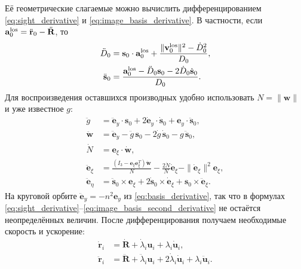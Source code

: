 \documentclass[a4paper,12pt]{article}
\begin{document}
Её геометрические слагаемые можно вычислить
дифференцированием \eqref{eq:sight_derivative} и
\eqref{eq:image_basis_derivative}. В частности, если
$\mathbf a_0^{\rm los}=\ddot{\mathbf r}_0-\ddot{\mathbf R}$,
то
\begin{equation}
\begin{aligned}
 \ddot D_0&=\mathbf s_0\cdot\mathbf a_0^{\rm los}
       +\frac{\|\mathbf v_0^{\rm los}\|^2-\dot D_0^2}{D_0},\\
 \ddot{\mathbf s}_0
   &=\frac{\mathbf a_0^{\rm los}
           -\ddot D_0\mathbf s_0
           -2\dot D_0\dot{\mathbf s}_0}{D_0}.
\end{aligned}
\label{eq:sight_second_derivative}
\end{equation}
Для воспроизведения оставшихся производных удобно использовать
$N=\|\mathbf w\|$ и уже известное $g$:
\begin{equation}
\begin{aligned}
 \ddot g&=\ddot{\mathbf e}_y\cdot\mathbf s_0
   +2\dot{\mathbf e}_y\cdot\dot{\mathbf s}_0
   +\mathbf e_y\cdot\ddot{\mathbf s}_0,\\
 \ddot{\mathbf w}&=\ddot{\mathbf e}_y-\ddot g\,\mathbf s_0
   -2\dot g\,\dot{\mathbf s}_0-g\,\ddot{\mathbf s}_0,\\
 \dot N&=\mathbf e_\xi\cdot\dot{\mathbf w},\\
 \ddot{\mathbf e}_\xi
   &=\frac{(I_3-\mathbf e_\xi\mathbf e_\xi^T)
                    \ddot{\mathbf w}}{N}
     -\frac{2\dot N}{N}\dot{\mathbf e}_\xi
     -\|\dot{\mathbf e}_\xi\|^2\mathbf e_\xi,\\
 \ddot{\mathbf e}_\eta
   &=\ddot{\mathbf s}_0\times\mathbf e_\xi
     +2\dot{\mathbf s}_0\times\dot{\mathbf e}_\xi
     +\mathbf s_0\times\ddot{\mathbf e}_\xi.
\end{aligned}
\label{eq:image_basis_second_derivative}
\end{equation}
На круговой орбите $\ddot{\mathbf e}_y=-n^2\mathbf e_y$
из \eqref{eq:basis_derivative}, так что в формулах
\eqref{eq:sight_derivative}--\eqref{eq:image_basis_second_derivative}
не остаётся неопределённых величин.
После дифференцирования получаем необходимые скорость и ускорение:
\begin{align}
    \dot{\mathbf r}_i&=\dot{\mathbf R}+\dot\lambda_i\mathbf u_i
                                    +\lambda_i\dot{\mathbf u}_i,\label{eq:required_velocity}\\
    \ddot{\mathbf r}_i&=\ddot{\mathbf R}+\ddot\lambda_i\mathbf u_i
                         +2\dot\lambda_i\dot{\mathbf u}_i
                         +\lambda_i\ddot{\mathbf u}_i.\label{eq:required_acceleration}
\end{align}
\end{document}
